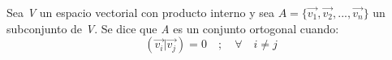 \documentclass[preview]{standalone}
\begin{document}
\begin{center}
Sea \textit{V} un espacio vectorial con producto interno y sea $A = \{\vec{v_1}, \vec{v_2}, ..., \vec{v_n}\}$ un subconjunto de \textit{V}. Se dice que \textit{A} es un conjunto ortogonal cuando: \[ (\vec{v_i} | \vec{v_j}) = 0 \quad ; \quad \forall \quad i \neq j  \]
\end{center}
\end{document}
